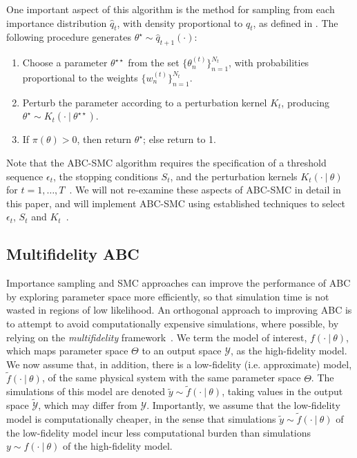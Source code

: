 \documentclass[review]{siamonline190516}
\begin{document}
One important aspect of this algorithm is the method for sampling from each importance distribution $\hat q_t$, with density proportional to $q_t$, as defined in .
The following procedure generates $\theta^\star \sim \hat q_{t+1}(\cdot)$:
\begin{enumerate}
\item Choose a parameter $\theta^{\star\star}$ from the set $\{ \theta_n^{(t)} \}_{n=1}^{N_t}$, with probabilities proportional to the weights $\{ w_n^{(t)} \}_{n=1}^{N_t}$.
\item Perturb the parameter according to a perturbation kernel $K_t$, producing $\theta^{\star} \sim K_{t}(\cdot~|~\theta^{\star\star})$.
\item If $\pi(\theta)>0$, then return $\theta^{\star}$; else return to 1.
\end{enumerate}
Note that the ABC-SMC algorithm requires the specification of a threshold sequence $\epsilon_t$, the stopping conditions $S_t$, and the perturbation kernels $K_t(\cdot~|~\theta)$ for $t=1,\dots,T$~\cite{Sisson2018}.
We will not re-examine these aspects of ABC-SMC in detail in this paper, and will implement ABC-SMC using established techniques to select $\epsilon_t$, $S_t$ and $K_t$~\cite{Toni2009,DelMoral2012,Beaumont2009,Filippi2013}.

\subsection{Multifidelity ABC}
\label{s:MFABC}
Importance sampling and SMC approaches can improve the performance of ABC by exploring parameter space more efficiently, so that simulation time is not wasted in regions of low likelihood.
An orthogonal approach to improving ABC is to attempt to avoid computationally expensive simulations, where possible, by relying on the \emph{multifidelity} framework~\cite{Prescott2020}.
We term the model of interest, $f(\cdot~|~\theta)$, which maps parameter space $\Theta$ to an output space $\mathcal Y$, as the high-fidelity model.
We now assume that, in addition, there is a low-fidelity (i.e. approximate) model, $\tilde f(\cdot~|~\theta)$, of the same physical system with the same parameter space $\Theta$.
The simulations of this model are denoted $\tilde y \sim \tilde f(\cdot~|~\theta)$, taking values in the output space $\tilde{\mathcal Y}$, which may differ from $\mathcal Y$.
Importantly, we assume that the low-fidelity model is computationally cheaper, in the sense that simulations $\tilde y \sim \tilde f(\cdot~|~\theta)$ of the low-fidelity model incur less computational burden than simulations $y \sim f(\cdot~|~\theta)$ of the high-fidelity model.
\end{document}
